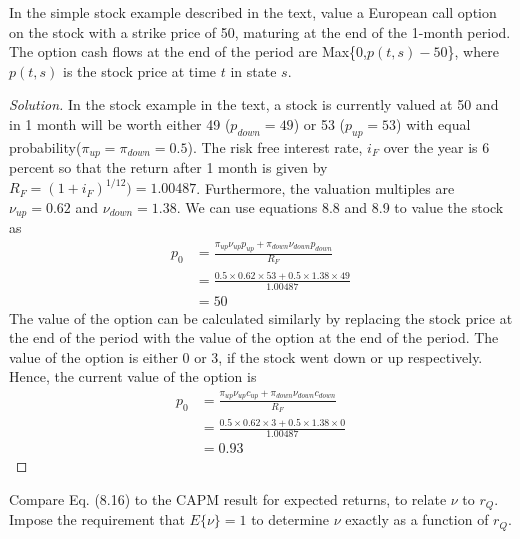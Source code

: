 \begin{problem}{8.1}
  In the simple stock example described in the text, value a European call option on the stock with a strike price of 50, maturing at the end of the 1-month period. The option cash flows at the end of the period are Max\{0,$p(t,s)-50$\}, where $p(t,s)$ is the stock price at time $t$ in state $s$.
\end{problem}

\begin{proof}[Solution]
  In the stock example in the text, a stock is currently valued at 50 and in 1 month will be worth either 49 ($p_{down}=49$) or 53 ($p_{up}=53$) with equal probability($\pi_{up}=\pi_{down}=0.5$). The risk free interest rate, $i_{F}$ over the year is 6 percent so that the return after 1 month is given by $R_{F}=(1+i_{F})^{1/12})=1.00487$. Furthermore, the valuation multiples are $\nu_{up}=0.62$ and $\nu_{down}=1.38$. We can use equations 8.8 and 8.9 to value the stock as
  \begin{align*}
   p_{0} &= \frac{\pi_{up}\nu_{up}p_{up} + \pi_{down}\nu_{down}p_{down}}{R_{F}} \\
	 &= \frac{0.5\times0.62\times53 + 0.5\times1.38\times49}{1.00487}\\
	 &= 50
  \end{align*}
  The value of the option can be calculated similarly by replacing the stock price at the end of the period with the value of the option at the end of the period. The value of the option is either 0 or 3, if the stock went down or up respectively. Hence, the current value of the option is
  \begin{align*}
   p_{0} &= \frac{\pi_{up}\nu_{up}c_{up} + \pi_{down}\nu_{down}c_{down}}{R_{F}}\\
	 &= \frac{0.5\times0.62\times3 + 0.5\times1.38\times0}{1.00487}\\
	 &= 0.93
  \end{align*}
\end{proof}

\begin{problem}{8.2}
 Compare Eq. (8.16) to the CAPM result for expected returns, to relate $\nu$ to $r_{Q}$. Impose the requirement that $E\{\nu\}=1$ to determine $\nu$ exactly as a function of $r_{Q}$.
\end{problem}

